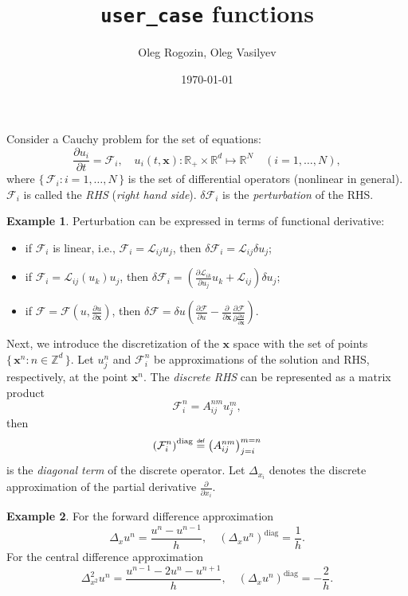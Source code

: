 \documentclass{article}
\title{\texttt{user\_case} functions}
\date{\today}
\author{Oleg Rogozin, Oleg Vasilyev}
\newcommand{\pder}[2][]{\frac{\partial#1}{\partial#2}}      %
\newcommand{\dder}[2][]{\Delta_{#2}#1}                      %
\newcommand{\dderdual}[2][]{\Delta^2_{#2^2}#1}
\newcommand{\LL}{\mathcal{L}}
\newcommand{\FF}{\mathcal{F}}
\newcommand{\bx}{\mathbf x}
\newcommand{\diag}[1]{\left(#1\right)^\mathrm{diag}}
\newcommand{\pert}[1]{\delta#1}
\newcommand{\Set}[2]{\{\,{#1}:{#2}\,\}}
\newcommand{\eqdef}{\mathrel{\overset{\makebox[0pt]{\mbox{\normalfont\tiny\sffamily def}}}{=}}}
\theoremstyle{definition}
\newtheorem{example}{Example}
\begin{document}
\maketitle

Consider a Cauchy problem for the set of equations:
\begin{equation}\label{eq:problem}
    \pder[u_i]{t} = \FF_i, \quad
    u_i(t,\bx): \mathbb{R}_+\times\mathbb{R}^d\mapsto\mathbb{R}^N \quad (i=1,\dots,N),
\end{equation}
where \(\Set{\FF_i}{i=1,\dots,N}\) is the set of differential operators (nonlinear in general).
\(\FF_i\) is called the \emph{RHS} (\emph{right hand side}).
\(\pert{\FF_i}\) is the \emph{perturbation} of the RHS.
\begin{example}
Perturbation can be expressed in terms of functional derivative:
\begin{itemize}
    \item if \(\FF_i\) is linear, i.e., \(\FF_i = \LL_{ij}u_j\), then
        \(\pert{\FF_i} = \LL_{ij}\pert{u}_j\);
    \item if \(\FF_i = \LL_{ij}(u_k)u_j\), then
        \(\pert{\FF_i} = \left( \pder[\LL_{ik}]{u_j}u_k + \LL_{ij} \right)\pert{u}_j\);
    \item if \(\FF = \FF(u, \pder[u]{\bx})\), then
        \(\pert{\FF} = \pert{u}\left(\pder[\FF]{u} - \pder{\bx}\pder[\FF]{\pder[u]{\bx}}\right)\).
\end{itemize}
\end{example}
Next, we introduce the discretization of the \(\bx\) space with the set of points \(\Set{\bx^n}{n\in\mathbb{Z}^d}\).
Let \(u_j^n\) and \(\FF_i^n\) be approximations of the solution and RHS, respectively, at the point \(\bx^n\).
The \emph{discrete RHS} can be represented as a matrix product
\begin{equation}\label{eq:matrix_representation}
       \FF_i^n = A_{ij}^{nm}u_j^m,
\end{equation}
then
\begin{equation}\label{eq:diagonal_term}
     \diag{\FF_i^n} \eqdef \left( A_{ij}^{nm} \right)_{j=i}^{m=n}
\end{equation}
is the \emph{diagonal term} of the discrete operator.
Let \(\dder{x_i}\) denotes the discrete approximation of the partial derivative \(\pder{x_i}\).
\begin{example}
    For the forward difference approximation
    \[ \dder[u^n]{x} = \frac{u^n-u^{n-1}}{h}, \quad \diag{\dder[u^n]{x}} = \frac1h. \]
    For the central difference approximation
    \[ \dderdual[u^n]{x} = \frac{u^{n-1}-2u^n-u^{n+1}}{h}, \quad \diag{\dder[u^n]{x}} = -\frac2h. \]
\end{example}
\end{document}
